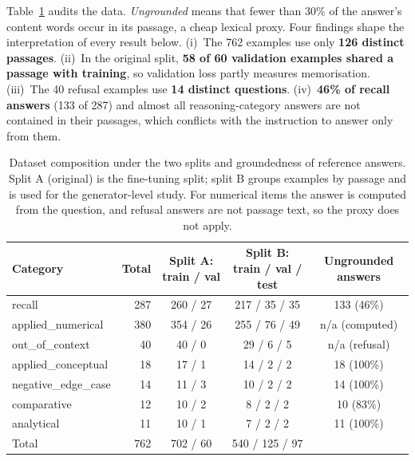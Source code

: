 \documentclass[conference]{IEEEtran}
\begin{document}
Table~\ref{tab:audit} audits the data. \emph{Ungrounded} means that fewer than 30\% of the answer's content words occur in its passage, a cheap lexical proxy. Four findings shape the interpretation of every result below. (i)~The 762 examples use only \textbf{126 distinct passages}. (ii)~In the original split, \textbf{58 of 60 validation examples shared a passage with training}, so validation loss partly measures memorisation. (iii)~The 40 refusal examples use \textbf{14 distinct questions}. (iv)~\textbf{46\% of recall answers} (133 of 287) and almost all reasoning-category answers are not contained in their passages, which conflicts with the instruction to answer only from them.

\begin{table}[t]
\caption{Dataset composition under the two splits and groundedness of reference answers. Split A (original) is the fine-tuning split; split B groups examples by passage and is used for the generator-level study. For numerical items the answer is computed from the question, and refusal answers are not passage text, so the proxy does not apply.}
\label{tab:audit}
\centering
\begin{tabular}{lrccc}
\toprule
Category & Total & Split A: train / val & Split B: train / val / test & Ungrounded answers \\
\midrule
recall               & 287 & 260 / 27 & 217 / 35 / 35 & 133 (46\%) \\
applied\_numerical   & 380 & 354 / 26 & 255 / 76 / 49 & n/a (computed) \\
out\_of\_context     & 40  & 40 / 0   & 29 / 6 / 5    & n/a (refusal) \\
applied\_conceptual  & 18  & 17 / 1   & 14 / 2 / 2    & 18 (100\%) \\
negative\_edge\_case & 14  & 11 / 3   & 10 / 2 / 2    & 14 (100\%) \\
comparative          & 12  & 10 / 2   & 8 / 2 / 2     & 10 (83\%) \\
analytical           & 11  & 10 / 1   & 7 / 2 / 2     & 11 (100\%) \\
\midrule
Total                & 762 & 702 / 60 & 540 / 125 / 97 & \\
\bottomrule
\end{tabular}
\end{table}
\end{document}
